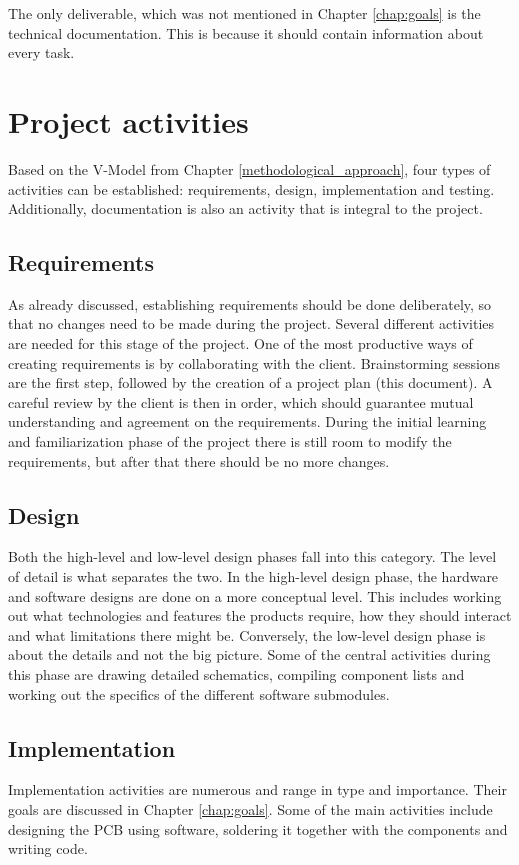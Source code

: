 \documentclass{report}
\begin{document}
	The only deliverable, which was not mentioned in Chapter \ref{chap:goals} is the technical documentation. This is because it should contain information about every task.
		
	
	\chapter{Project activities}
	Based on the V-Model from Chapter \ref{methodological_approach}, four types of activities can be established: requirements, design, implementation and testing. Additionally, documentation is also an activity that is integral to the project.
	
	\section{Requirements}
	As already discussed, establishing requirements should be done deliberately, so that no changes need to be made during the project. Several different activities are needed for this stage of the project. One of the most productive ways of creating requirements is by collaborating with the client. Brainstorming sessions are the first step, followed by the creation of a project plan (this document). A careful review by the client is then in order, which should guarantee mutual understanding and agreement on the requirements. During the initial learning and familiarization phase of the project there is still room to modify the requirements, but after that there should be no more changes.
	
	\section{Design}
	Both the high-level and low-level design phases fall into this category. The level of detail is what separates the two. In the high-level design phase, the hardware and software designs are done on a more conceptual level. This includes working out what technologies and features the products require, how they should interact and what limitations there might be. Conversely, the low-level design phase is about the details and not the big picture. Some of the central activities during this phase are drawing detailed schematics, compiling component lists and working out the specifics of the different software submodules. 

	\section{Implementation}
	Implementation activities are numerous and range in type and importance. Their goals are discussed in Chapter \ref{chap:goals}. Some of the main activities include designing the PCB using software, soldering it together with the components and writing code.
	
\end{document}
